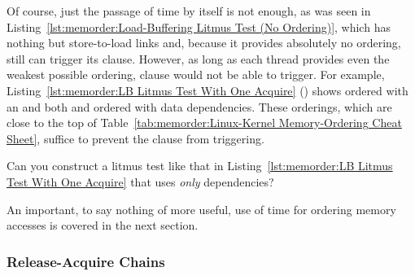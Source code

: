 Of course, just the passage of time by itself is not enough, as
was seen in
Listing~\ref{lst:memorder:Load-Buffering Litmus Test (No Ordering)},
which has nothing but store-to-load links and, because it provides
absolutely no ordering, still can trigger its  clause.
However, as long as each thread provides even the weakest possible
ordering,  clause would not be able to trigger.
For example,
Listing~\ref{lst:memorder:LB Litmus Test With One Acquire}
()
shows  ordered with an  and
both  and  ordered with data dependencies.
These orderings, which are close to the top of
Table~\ref{tab:memorder:Linux-Kernel Memory-Ordering Cheat Sheet},
suffice to prevent the  clause from triggering.

\QuickQuiz{}
	Can you construct a litmus test like that in
	Listing~\ref{lst:memorder:LB Litmus Test With One Acquire}
	that uses \emph{only} dependencies?
 \QuickQuizEnd

An important, to say nothing of more useful, use of time for ordering
memory accesses is covered in the next section.

\subsubsection{Release-Acquire Chains}
\label{sec:memorder:Release-Acquire Chains}

